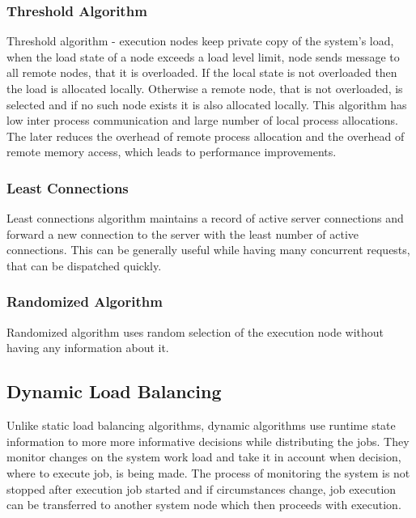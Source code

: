 \subsubsection{Threshold Algorithm}
Threshold algorithm - execution nodes keep private copy of the system's load, when the load state of a node exceeds a load level limit,
node sends message to all remote nodes, that it is overloaded.
If the local state is not overloaded then the load is allocated locally.
Otherwise a remote node, that is not overloaded, is selected and if no such node exists it is also allocated locally.
This algorithm has low inter process communication and large number of local process allocations.
The later reduces the overhead of remote process allocation and the overhead of remote memory access,
which leads to performance improvements\cite{web:staticAndDynamicLoadBalancing}.

\subsubsection{Least Connections}
Least connections algorithm maintains a record of active server connections
and forward a new connection to the server with the least number of active connections\cite{web:ibmLoadBalancingDecisions}.
This can be generally useful while having many concurrent requests, that can be dispatched quickly.

\subsubsection{Randomized Algorithm}
Randomized algorithm uses random selection of the execution node without having any information about it.

\subsection{Dynamic Load Balancing}\label{subsec:dynamic-load-balancing}
Unlike static load balancing algorithms, dynamic algorithms use runtime state information to more more informative decisions while distributing the jobs.
They monitor changes on the system work load and take it in account when decision, where to execute job, is being made.
The process of monitoring the system is not stopped after execution job started and if circumstances change,
job execution can be transferred to another system node which then proceeds with execution.

